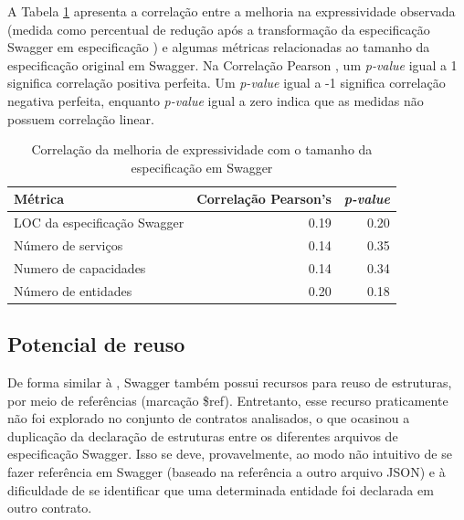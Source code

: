 A Tabela \ref{tab:size-corr} apresenta a correlação entre a
melhoria na expressividade observada (medida como percentual de redução após a
transformação da especificação Swagger em especificação \neoidl{}) e algumas
métricas relacionadas ao tamanho da especificação original em Swagger. Na
Correlação Pearson \cite{benesty2009pearson}, um \emph{p-value} igual a 1 significa correlação
positiva perfeita. Um \emph{p-value} igual a -1 significa correlação negativa
perfeita, enquanto \emph{p-value} igual a zero indica que as medidas não possuem
correlação linear.

% 
% 

\begin{table}[htb]
\caption{Correlação da melhoria de expressividade com o tamanho da especificação
em Swagger}
\begin{center}
\begin{tabular}{lrr} 
\toprule
Métrica & Correlação Pearson's & \emph{p-value} \\ \hline \hline 
LOC da especificação Swagger & 0.19 &  0.20 \\ 
Número de serviços & 0.14 & 0.35 \\ 
Numero de capacidades & 0.14 & 0.34 \\
Número de entidades & 0.20 & 0.18 \\ \bottomrule 
\end{tabular} 
\end{center}
\label{tab:size-corr}
\end{table}



\subsection{Potencial de reuso}

De forma similar à \neoidl{}, Swagger também possui recursos para reuso de
estruturas, por meio de referências (marcação \$ref). Entretanto, esse recurso
praticamente não foi explorado no conjunto de contratos analisados, o que
ocasinou a duplicação da declaração de estruturas entre os diferentes arquivos
de especificação Swagger. Isso se deve, provavelmente, ao modo não intuitivo de
se fazer referência em Swagger (baseado na referência a outro arquivo JSON) e à
dificuldade de se identificar que uma determinada entidade foi declarada em
outro contrato.

